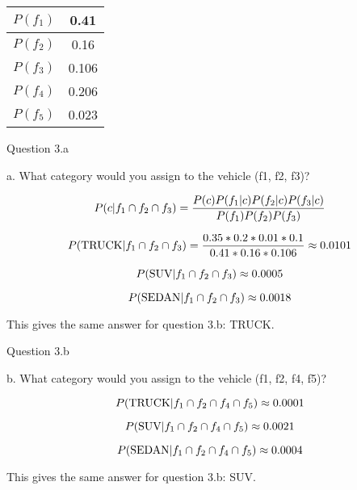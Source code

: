 \documentclass{article}
\begin{document}
%
%

\begin{center}
 \begin{tabular}{||c c ||} 
 \hline
 $P(f_1)$&0.41\\
 \hline
 $P(f_2)$&0.16\\
 \hline
 $P(f_3)$&0.106\\
 \hline
 $P(f_4)$&0.206\\
 \hline
 $P(f_5)$ & 0.023\\ [1ex] 
 \hline
\end{tabular}
\end{center}



\begin{center} Question 3.a \end{center}

a. 	What category would you assign to the vehicle (f1, f2, f3)?

\begin{equation}
	\nonumber P(c|f_1 \cap f_2 \cap f_3) = \frac{P(c) P(f_1|c)P(f_2|c)P(f_3|c)}{P(f_1)P(f_2)P(f_3)}
\end{equation}

\begin{equation}
	\nonumber P(\text{TRUCK}|f_1 \cap f_2 \cap f_3) = \frac{0.35 * 0.2 * 0.01 * 0.1 }{0.41 * 0.16 * 0.106} \approx 0.0101
\end{equation}

\begin{equation}
	\nonumber P(\text{SUV}|f_1 \cap f_2 \cap f_3) \approx 0.0005
\end{equation}

\begin{equation}
	\nonumber P(\text{SEDAN}|f_1 \cap f_2 \cap f_3) \approx 0.0018
\end{equation}

This gives the same answer for question 3.b: TRUCK.

\begin{center} Question 3.b \end{center}

b. 	What category would you assign to the vehicle (f1, f2, f4, f5)?

\begin{equation}
	\nonumber P(\text{TRUCK}|f_1 \cap f_2 \cap f_4 \cap f_5) \approx 0.0001
\end{equation}

\begin{equation}
	\nonumber P(\text{SUV}|f_1 \cap f_2 \cap f_4 \cap f_5) \approx 0.0021
\end{equation}

\begin{equation}
	\nonumber P(\text{SEDAN}|f_1 \cap f_2 \cap f_4 \cap f_5) \approx 0.0004
\end{equation}

This gives the same answer for question 3.b: SUV.
\end{document}
